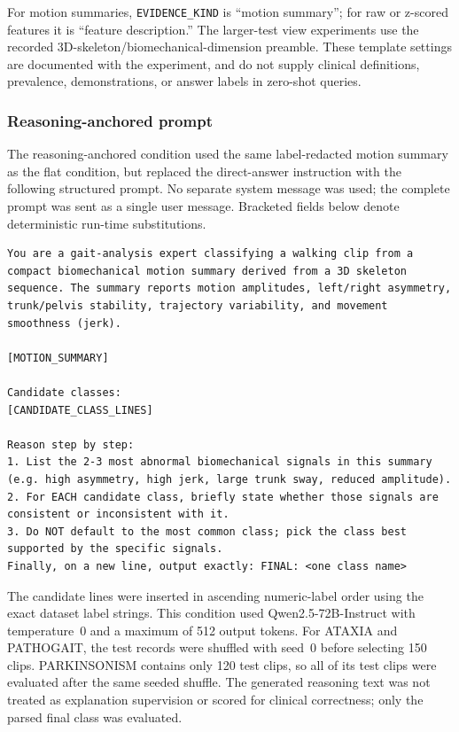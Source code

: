 For motion summaries, \texttt{EVIDENCE\_KIND} is ``motion summary''; for raw or z-scored features it is ``feature description.'' The larger-test view experiments use the recorded 3D-skeleton/biomechanical-dimension preamble. These template settings are documented with the experiment, and do not supply clinical definitions, prevalence, demonstrations, or answer labels in zero-shot queries.


\subsubsection{Reasoning-anchored prompt}

The reasoning-anchored condition used the same label-redacted motion
summary as the flat condition, but replaced the direct-answer
instruction with the following structured prompt. No separate system
message was used; the complete prompt was sent as a single user
message. Bracketed fields below denote deterministic run-time
substitutions.

\begin{Verbatim}[fontsize=\scriptsize,frame=single,breaklines=true,breakanywhere=true]
You are a gait-analysis expert classifying a walking clip from a compact biomechanical motion summary derived from a 3D skeleton sequence. The summary reports motion amplitudes, left/right asymmetry, trunk/pelvis stability, trajectory variability, and movement smoothness (jerk).

[MOTION_SUMMARY]

Candidate classes:
[CANDIDATE_CLASS_LINES]

Reason step by step:
1. List the 2-3 most abnormal biomechanical signals in this summary (e.g. high asymmetry, high jerk, large trunk sway, reduced amplitude).
2. For EACH candidate class, briefly state whether those signals are consistent or inconsistent with it.
3. Do NOT default to the most common class; pick the class best supported by the specific signals.
Finally, on a new line, output exactly: FINAL: <one class name>
\end{Verbatim}

The candidate lines were inserted in ascending numeric-label order
using the exact dataset label strings. This condition used
Qwen2.5-72B-Instruct with temperature~0 and a maximum of 512 output
tokens. For ATAXIA and PATHOGAIT, the test records were shuffled with
seed~0 before selecting 150 clips. PARKINSONISM contains only 120 test
clips, so all of its test clips were evaluated after the same seeded
shuffle. The generated reasoning text was not treated as explanation
supervision or scored for clinical correctness; only the parsed final
class was evaluated.

